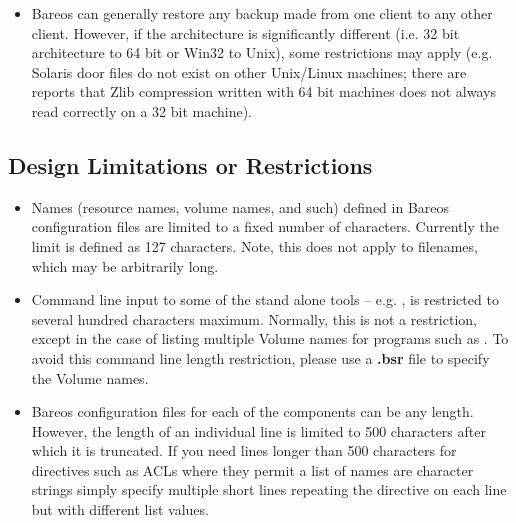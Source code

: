 \begin{itemize}
\item Bareos can generally restore any backup made from one client
   to any other client. However, if the architecture is significantly
   different (i.e. 32 bit architecture to 64 bit or Win32 to Unix),
   some restrictions may apply (e.g. Solaris door files do not exist
   on other Unix/Linux machines; there are reports that Zlib compression
   written with 64 bit machines does not always read correctly on a 32 bit
   machine).
\end{itemize}

\subsection{Design Limitations or Restrictions}

\begin{itemize}
\item Names (resource names, volume names, and such) defined in Bareos
   configuration files are limited to a fixed number of
   characters.  Currently the limit is defined as 127 characters.  Note,
   this does not apply to filenames, which may be arbitrarily long.
\item Command line input to some of the stand alone tools -- e.g. ,
    is restricted to several hundred characters maximum.
   Normally, this is not a restriction, except in the case of listing
   multiple Volume names for programs such as . To avoid
   this command line length restriction, please use a {\bf .bsr}
   file to specify the Volume names.
\item Bareos configuration files for each of the components can be
   any length. However, the length of an individual line is limited
   to 500 characters after which it is truncated.  If you need lines
   longer than 500 characters for directives such as ACLs where
   they permit a list of names are character strings simply
   specify multiple short lines repeating the directive on
   each line but with different list values.
\end{itemize}

